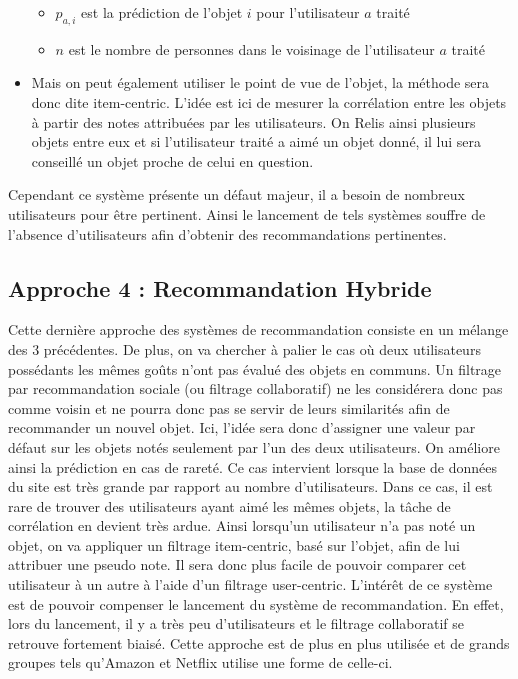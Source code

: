 \documentclass[light]{ceri}
\begin{document}
\begin{itemize}
\begin{itemize}
                \item $p_{a,i}$ est la prédiction de l'objet $i$ pour l'utilisateur $a$ traité 
                \item $n$ est le nombre de personnes dans le voisinage de l'utilisateur $a$ traité
            \end{itemize}
        \item Mais on peut également utiliser le point de vue de l'objet, la méthode sera donc dite item-centric. L'idée est ici de mesurer la corrélation entre les objets à partir des notes attribuées par les utilisateurs. On Relis ainsi plusieurs objets entre eux et si l'utilisateur traité a aimé un objet donné, il lui sera conseillé un objet proche de celui en question.
    \end{itemize}
Cependant ce système présente un défaut majeur, il a besoin de nombreux utilisateurs pour être pertinent. Ainsi le lancement de tels systèmes souffre de l'absence d'utilisateurs afin d'obtenir des recommandations pertinentes.     

\subsection{Approche 4 : Recommandation Hybride}
Cette dernière approche des systèmes de recommandation consiste en un mélange des 3 précédentes. De plus, on va chercher à palier le cas où deux utilisateurs possédants les mêmes goûts n'ont pas évalué des objets en communs. Un filtrage par recommandation sociale (ou filtrage collaboratif) ne les considérera donc pas comme voisin et ne pourra donc pas se servir de leurs similarités afin de recommander un nouvel objet. Ici, l'idée sera donc d'assigner une valeur par défaut sur les objets notés seulement par l'un des deux utilisateurs. On améliore ainsi la prédiction en cas de rareté. Ce cas intervient lorsque la base de données du site est très grande par rapport au nombre d'utilisateurs. Dans ce cas, il est rare de trouver des utilisateurs ayant aimé les mêmes objets, la tâche de corrélation en devient très ardue. Ainsi lorsqu'un utilisateur n'a pas noté un objet, on va appliquer un filtrage item-centric, basé sur l'objet, afin de lui attribuer une pseudo note. Il sera donc plus facile de pouvoir comparer cet utilisateur à un autre à l'aide d'un filtrage user-centric. L'intérêt de ce système est de pouvoir compenser le lancement du système de recommandation. En effet, lors du lancement, il y a très peu d'utilisateurs et le filtrage collaboratif se retrouve fortement biaisé. Cette approche est de plus en plus utilisée et de grands groupes tels qu'Amazon et Netflix utilise une forme de celle-ci.
\end{document}
